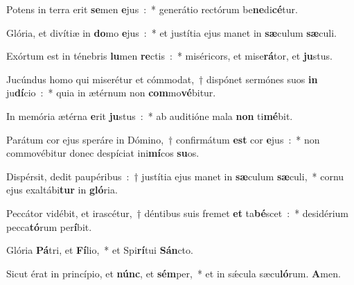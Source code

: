 ﻿\item Potens in terra erit \textbf{se}\-men \textbf{e}jus~:~* generátio rectórum be\textbf{ne}di\textbf{cé}tur.
\item Glória, et divítiæ in \textbf{do}\-mo \textbf{e}jus~:~* et justítia ejus manet in \textbf{sæ}\-culum \textbf{sæ}culi.
\item Exórtum est in ténebris \textbf{lu}\-men \textbf{re}\-ctis~:~* miséricors, et mise\textbf{rá}\-tor, et \textbf{ju}stus.
\item Jucúndus homo qui miserétur et cómmodat,~† dispónet sermónes suos \textbf{in} ju\textbf{dí}\-cio~:~* quia in ætérnum non \textbf{com}mo\textbf{vé}bitur.
\item In memória ætérna \textbf{e}\-rit \textbf{ju}\-stus~:~* ab auditióne mala \textbf{non} ti\textbf{mé}bit.
\item Parátum cor ejus speráre in Dómino,~† confirmátum \textbf{est} cor \textbf{e}jus~:~* non commovébitur donec despíciat ini\textbf{mí}\-cos \textbf{su}os.
\item Dispérsit, dedit paupéribus~:~† justítia ejus manet in \textbf{sæ}\-culum \textbf{sæ}\-culi,~* cornu ejus exaltábi\textbf{tur} in \textbf{gló}ria.
\item Peccátor vidébit, et irascétur,~† déntibus suis fremet \textbf{et} ta\textbf{bé}\-scet~:~* desidérium pecca\textbf{tó}\-rum per\textbf{í}bit.
\item Glória \textbf{Pá}\-tri, et \textbf{Fí}\-lio,~* et Spi\textbf{rí}\-tui \textbf{Sán}cto.
\item Sicut érat in princípio, et \textbf{núnc}, et \textbf{sém}\-per,~* et in sǽcula sæcu\textbf{ló}\-rum. \textbf{A}men.
